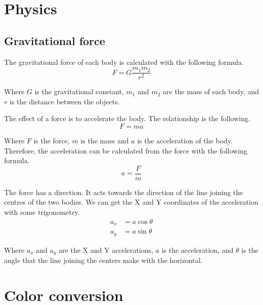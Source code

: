 \documentclass{amsart}
\begin{document}
\section{Physics}

\subsection{Gravitational force}

The gravitational force of each body is calculated with the following formula.
\begin{displaymath}
  F = G \frac{m_1m_2}{r^2}
\end{displaymath}

Where $G$ is the gravitational constant, $m_1$ and $m_2$ are the mass of
each body, and $r$ is the distance between the objects.

The effect of a force is to accelerate the body. The relationship is the
following.
\begin{displaymath}
  F = m a
\end{displaymath}

Where $F$ is the force, $m$ is the mass and $a$ is the acceleration of
the body. Therefore, the acceleration can be calculated from the force with the
following formula.
\begin{displaymath}
  a = \frac{F}{m}
\end{displaymath}

The force has a direction. It acts towards the direction of the line joining
the centres of the two bodies. We can get the X and Y coordinates of the
acceleration with some trigonometry.
\begin{align*}
  a_x &= a \cos \theta \\
  a_y &= a \sin \theta
\end{align*}

Where $a_x$ and $a_y$ are the X and Y accelerations, $a$ is the
acceleration, and $\theta$ is the angle that the line joining the centers make
with the horizontal.

\newpage
\section{Color conversion}
\end{document}
